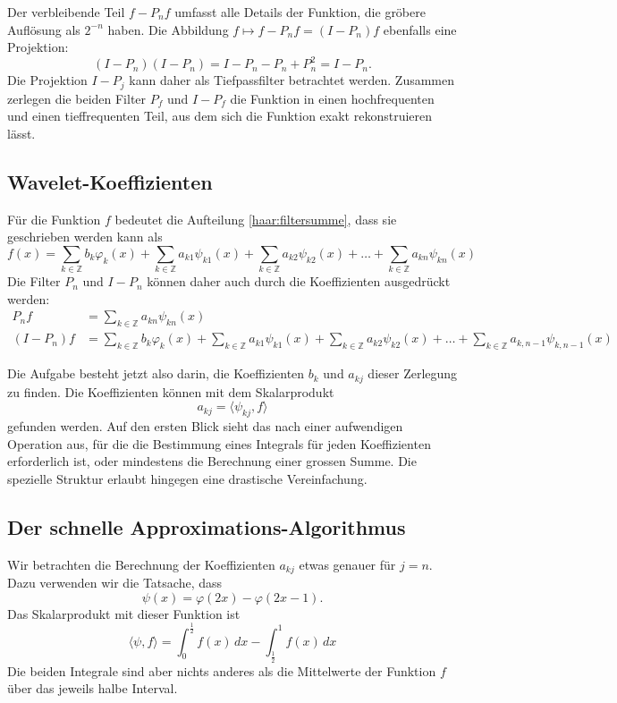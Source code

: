 Der verbleibende Teil $f-P_nf$ umfasst alle Details der Funktion, die
gröbere Auflösung als $2^{-n}$ haben.
Die Abbildung $f\mapsto f-P_nf = (I-P_n)f$ ebenfalls eine Projektion:
\[
(I-P_n)(I-P_n) = I -P_n - P_n + P_n^2 = I - P_n.
\]
Die Projektion $I-P_j$ kann daher als Tiefpassfilter betrachtet werden.
Zusammen zerlegen die beiden Filter $P_f$ und $I-P_f$ die Funktion
in einen hochfrequenten und einen tieffrequenten Teil, aus dem sich
die Funktion exakt rekonstruieren lässt.

\subsection{Wavelet-Koeffizienten}
Für die Funktion $f$ bedeutet die Aufteilung \eqref{haar:filtersumme},
dass sie geschrieben werden kann als
\[
f(x)
=
\sum_{k\in\mathbb Z} b_k\varphi_k(x)
+
\sum_{k\in\mathbb Z} a_{k1}\psi_{k1}(x)
+
\sum_{k\in\mathbb Z} a_{k2}\psi_{k2}(x)
+
\dots
+
\sum_{k\in\mathbb Z} a_{kn}\psi_{kn}(x)
\]
Die Filter $P_n$ und $I-P_n$ können daher auch durch die Koeffizienten
ausgedrückt werden:
\begin{align*}
P_nf 
&=
\sum_{k\in\mathbb Z} a_{kn}\psi_{kn}(x)
\\
(I-P_n)f
&=
\sum_{k\in\mathbb Z} b_k\varphi_k(x)
+
\sum_{k\in\mathbb Z} a_{k1}\psi_{k1}(x)
+
\sum_{k\in\mathbb Z} a_{k2}\psi_{k2}(x)
+
\dots
+
\sum_{k\in\mathbb Z} a_{k,n-1}\psi_{k,n-1}(x)
\end{align*}

Die Aufgabe besteht jetzt also darin, die Koeffizienten $b_k$ und
$a_{kj}$ dieser Zerlegung zu finden.
Die Koeffizienten können mit dem Skalarprodukt
\[
a_{kj} = \langle \psi_{kj}, f\rangle
\]
gefunden werden.
Auf den ersten Blick sieht das nach einer aufwendigen Operation
aus, für die die Bestimmung eines Integrals für jeden Koeffizienten
erforderlich ist, oder mindestens die Berechnung einer grossen Summe.
Die spezielle Struktur erlaubt hingegen eine drastische Vereinfachung.


\subsection{Der schnelle Approximations-Algorithmus}
Wir betrachten die Berechnung der Koeffizienten $a_{kj}$ etwas genauer für
$j=n$.
Dazu verwenden wir die Tatsache, dass 
\[
\psi(x) = \varphi(2x) - \varphi(2x-1).
\]
Das Skalarprodukt mit dieser Funktion ist
\[
\langle \psi,f\rangle
=
\int_0^{\frac12} f(x)\,dx - \int_{\frac12}^1 f(x)\,dx
\]
Die beiden Integrale sind aber nichts anderes als die Mittelwerte
der Funktion $f$ über das jeweils halbe Interval.

